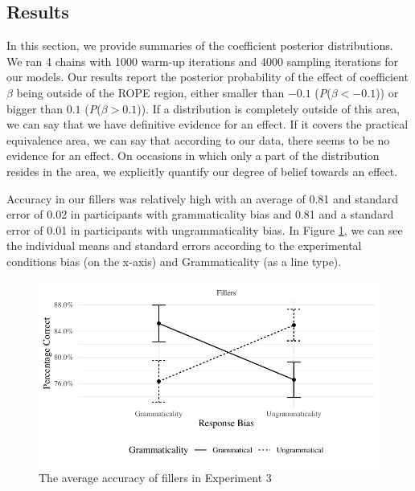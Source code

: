 



\subsection{Results}

In this section, we provide summaries of the coefficient posterior distributions. We ran 4 chains with 1000 warm-up iterations and 4000 sampling iterations for our models. Our results report the posterior probability of the effect of coefficient $\beta$ being outside of the ROPE region, either smaller than $-0.1$ (\emph{P}($\beta < -0.1$)) or bigger than $0.1$ (\emph{P}($\beta > 0.1$)). If a distribution is completely outside of this area, we can say that we have definitive evidence for an effect. If it covers the practical equivalence area, we can say that according to our data, there seems to be no evidence for an effect. On occasions in which only a part of the distribution resides in the area, we explicitly quantify our degree of belief towards an effect. 



Accuracy in our fillers was relatively high with an average of 0.81 and standard error of 0.02 in participants with grammaticality bias and 0.81 and a standard error of 0.01 in participants with ungrammaticality bias. In Figure \ref{fig:FillerAverage}, we can see the individual means and standard errors according to the experimental conditions {bias} (on the x-axis) and {Grammaticality} (as a line type).


\begin{knitrout}
\color{fgcolor}\begin{figure}[hbt!]

{\centering \includegraphics[width=\linewidth]{figure/FillerAverage-1} 

}

\caption{The average accuracy of fillers in Experiment 3}\label{fig:FillerAverage}
\end{figure}

\end{knitrout}


